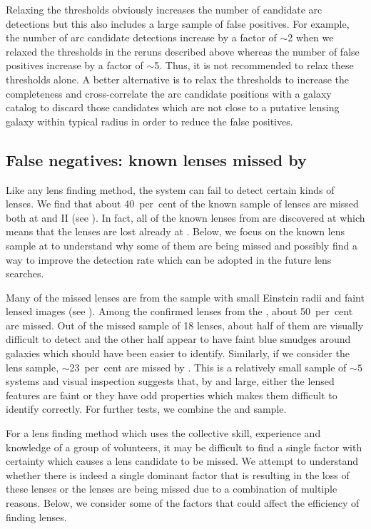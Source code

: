 \documentclass[useAMS,usenatbib,a4paper]{mn2e}
\begin{document}
Relaxing the thresholds obviously increases the number of candidate arc
detections but this also includes a large sample of false positives.
For example, the number of arc candidate detections increase by a factor
of $\sim$2 when we relaxed the thresholds in the reruns described above
whereas the number of false positives increase by a factor of $\sim$5.
Thus, it is not recommended to relax these thresholds alone. A better
alternative is to relax the thresholds to increase the completeness and
cross-correlate the arc candidate positions with a galaxy catalog to
discard those candidates which are not close to a putative lensing
galaxy within typical radius in order to reduce the false positives.


\subsection{False negatives: known lenses missed by \sw}
\label{sec:fn}
Like any lens finding method, the \sw system can fail to detect certain
kinds of lenses.  We find that about 40~per~cent of the known sample of lenses
are missed both at \StageOne and II (see ). In fact, all
of the known lenses from \StageOne are discovered at \StageTwo which
means that the lenses are lost already at \StageOne. Below, we focus on the known
lens sample at \StageOne to understand why some of them are being missed
and possibly find a way to improve the detection rate which can be
adopted in the future \sw lens searches.

Many of the missed lenses are from the \rf sample with small
Einstein radii and faint lensed images (see ). Among
the confirmed lenses from the \rf, about 50~per~cent are missed. Out of the
missed sample of 18 lenses, about half of them are visually difficult to
detect and the other half appear to have faint blue smudges around
galaxies which should have been easier to identify. Similarly,
if we consider the \af lens sample, $\sim$23~per~cent are missed by \sw. This
is a relatively small sample of $\sim 5$ systems and visual inspection
suggests that, by and large, either the lensed features are faint
or they have odd properties which makes them difficult to identify
correctly. For further tests, we combine the \rf and \af sample.

For a lens finding method which uses the collective skill, experience and
knowledge of a group of volunteers, it may be difficult to find a single
factor with certainty which causes a lens candidate to be missed. We
attempt to understand whether there is indeed a single dominant factor
that is resulting in the loss of these lenses or the lenses are being
missed due to a combination of multiple reasons. Below, we consider some
of the factors that could affect the efficiency of finding lenses.
\end{document}
